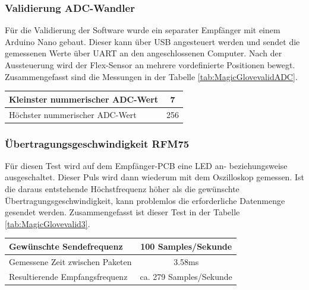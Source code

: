 \subsubsection*{Validierung ADC-Wandler}
Für die Validierung der Software wurde ein separater Empfänger mit einem Arduino Nano gebaut. Dieser kann über USB angesteuert werden und sendet die gemessenen Werte über UART an den angeschlossenen Computer.
Nach der Aussteuerung wird der Flex-Sensor an mehrere vordefinierte Positionen bewegt. Zusammengefasst sind die Messungen in der Tabelle \ref{tab:MagicGlovevalidADC}.
\begin{center}
	\begin{tabular}{l|c}
		\hline 
		Kleinster nummerischer ADC-Wert & 7 \\ \hline
		Höchster nummerischer ADC-Wert & 256 \\ \hline
	\end{tabular} 
	\label{tab:MagicGlovevalidADC}
\end{center}

\subsubsection*{Übertragungsgeschwindigkeit RFM75}
Für diesen Test wird auf dem Empfänger-PCB eine LED an- beziehungsweise ausgeschaltet. Dieser Puls wird dann wiederum mit dem Oszilloskop gemessen. Ist die daraus entstehende Höchstfrequenz höher als die gewünschte Übertragungsgeschwindigkeit, kann problemlos die erforderliche Datenmenge gesendet werden. Zusammengefasst ist dieser Test in der Tabelle \ref{tab:MagicGlovevalid3}.
\begin{center}
	\begin{tabular}{l|c}
		\hline 
		Gewünschte Sendefrequenz & 100 Samples/Sekunde \\ \hline
		Gemessene Zeit zwischen Paketen & 3.58ms \\ \hline
		Resultierende Empfangsfrequenz & ca. 279 Samples/Sekunde \\ \hline
	\end{tabular} 
	\label{tab:MagicGlovevalid3}
\end{center}
\newpage
